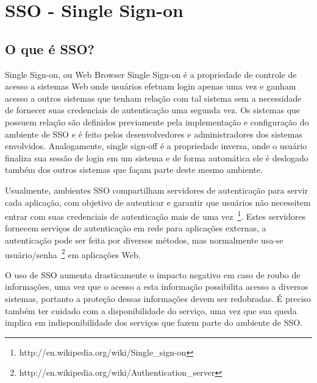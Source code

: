 \documentclass[11pt]{article}
\begin{document}
\lstset{language=Ruby}


\clearpage

\clearpage

\tableofcontents
\clearpage
\listoffigures

\clearpage



\section{SSO - Single Sign-on}

\subsection{O que é SSO?}

Single Sign-on, ou Web Browser Single Sign-on é a propriedade de controle de
acesso a sistemas Web onde usuários efetuam login apenas uma vez e ganham acesso a
outros sistemas que tenham relação com tal sistema sem a necessidade de fornecer
suas credenciais de autenticação uma segunda vez. Os sistemas que possuem
relação são definidos previamente pela implementação e configuração do
ambiente de SSO e é feito pelos desenvolvedores e administradores dos sistemas envolvidos.
Analogamente, single sign-off é a propriedade inversa, onde o usuário finaliza
sua sessão de login em um sistema e de forma automática ele é deslogado também
dos outros sistemas que façam parte deste mesmo ambiente.

Usualmente, ambientes SSO compartilham servidores de autenticação para servir
cada aplicação, com objetivo de autenticar e garantir que usuários não
necessitem entrar com suas credenciais de autenticação mais de uma
vez~\footnote{http://en.wikipedia.org/wiki/Single\_sign-on}. Estes servidores
fornecem serviços de autenticação em rede para aplicações externas, a
autenticação pode ser feita por diversos métodos, mas normalmente usa-se
usuário/senha~\footnote{http://en.wikipedia.org/wiki/Authentication\_server} em
aplicações Web.

O uso de SSO aumenta drasticamente o impacto negativo em caso de roubo de
informações, uma vez que o acesso a esta informação possibilita acesso a
diversos sistemas, portanto a proteção dessas informações devem ser redobradas.
É preciso também ter cuidado com a disponibilidade do serviço, uma vez
que sua queda implica em indisponibilidade dos serviços que fazem parte do
ambiente de SSO.
\end{document}
